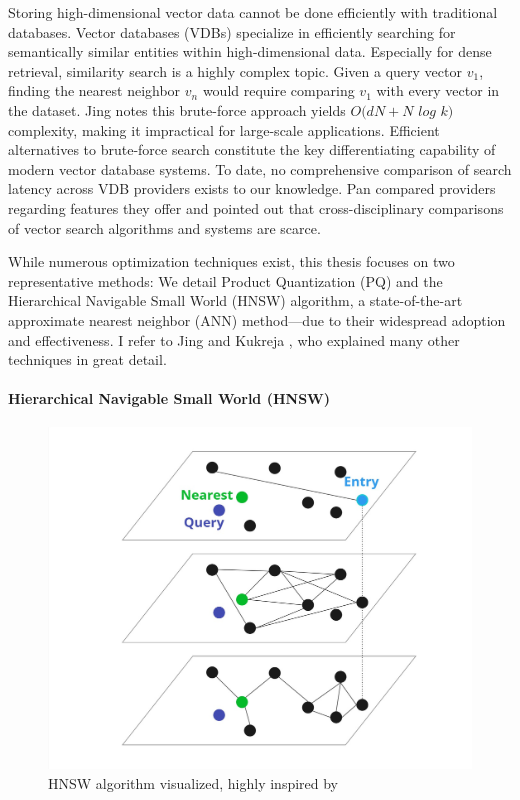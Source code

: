 Storing high-dimensional vector data cannot be done efficiently with traditional databases. Vector databases (VDBs) specialize in efficiently searching for semantically similar entities within high-dimensional data. Especially for dense retrieval, similarity search is a highly complex topic. Given a query vector $v_1$, finding the nearest neighbor $v_{n}$ would require comparing $v_1$ with every vector in the dataset. Jing \cite{Jing.2024} notes this brute-force approach yields $O(dN+N$ $log$ $k)$ complexity, making it impractical for large-scale applications. Efficient alternatives to brute-force search constitute the key differentiating capability of modern vector database systems. To date, no comprehensive comparison of search latency across VDB providers exists to our knowledge. Pan \cite{Pan.2024} compared providers regarding features they offer and pointed out that cross-disciplinary comparisons of vector search algorithms and systems are scarce.

While numerous optimization techniques exist, this thesis focuses on two representative methods: We detail Product Quantization (PQ) and the Hierarchical Navigable Small World (HNSW) algorithm, a state-of-the-art approximate nearest neighbor (ANN) method—due to their widespread adoption and effectiveness. I refer to Jing \cite{Jing.2024} and Kukreja \cite{Kukreja.2023}, who explained many other techniques in great detail.

\paragraph{Hierarchical Navigable Small World (HNSW)}

\begin{figure}[h!]
    \centering
    \includegraphics[width=\textwidth]{images/HNSW.jpg}
    \caption{HNSW algorithm visualized, highly inspired by \cite{Pinecone.22.01.2025}}
    \label{fig:HNSW}
\end{figure}

